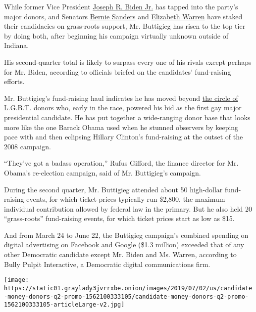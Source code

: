 While former Vice President
\href{https://www.nytimes3xbfgragh.onion/interactive/2020/us/elections/joe-biden.html}{Joseph
R. Biden Jr.} has tapped into the party's major donors, and Senators
\href{https://www.nytimes3xbfgragh.onion/interactive/2020/us/elections/bernie-sanders.html}{Bernie
Sanders} and
\href{https://www.nytimes3xbfgragh.onion/interactive/2020/us/elections/elizabeth-warren.html}{Elizabeth
Warren} have staked their candidacies on grass-roots support, Mr.
Buttigieg has risen to the top tier by doing both, after beginning his
campaign virtually unknown outside of Indiana.

His second-quarter total is likely to surpass every one of his rivals
except perhaps for Mr. Biden, according to officials briefed on the
candidates' fund-raising efforts.

Mr. Buttigieg's fund-raising haul indicates he has moved beyond
\href{https://www.nytimes3xbfgragh.onion/2019/04/30/us/politics/pete-buttigieg-gay-donors.html}{the
circle of L.G.B.T. donors} who, early in the race, powered his bid as
the first gay major presidential candidate. He has put together a
wide-ranging donor base that looks more like the one Barack Obama used
when he stunned observers by keeping pace with and then eclipsing
Hillary Clinton's fund-raising at the outset of the 2008 campaign.

``They've got a badass operation,'' Rufus Gifford, the finance director
for Mr. Obama's re-election campaign, said of Mr. Buttigieg's campaign.

During the second quarter, Mr. Buttigieg attended about 50 high-dollar
fund-raising events, for which ticket prices typically run \$2,800, the
maximum individual contribution allowed by federal law in the primary.
But he also held 20 ``grass-roots'' fund-raising events, for which
ticket prices start as low as \$15.

And from March 24 to June 22, the Buttigieg campaign's combined spending
on digital advertising on Facebook and Google (\$1.3 million) exceeded
that of any other Democratic candidate except Mr. Biden and Ms. Warren,
according to Bully Pulpit Interactive, a Democratic digital
communications firm.

\href{https://www.nytimes3xbfgragh.onion/interactive/2019/07/02/us/elections/candidate-money-donors-q2.html}{}

\texttt{[image: https://static01.graylady3jvrrxbe.onion/images/2019/07/02/us/candidate-money-donors-q2-promo-1562100333105/candidate-money-donors-q2-promo-1562100333105-articleLarge-v2.jpg]}

